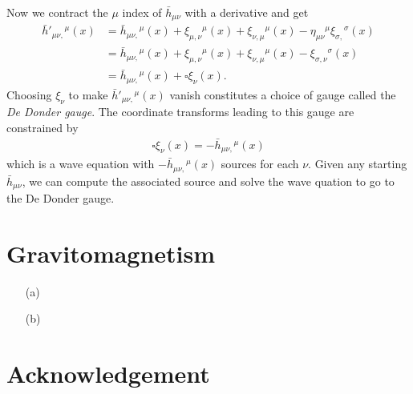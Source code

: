 \documentclass[10pt, a4paper]{article}
\begin{document}
\begin{enumerate}
\begin{align*}
  \end{align*}
  Now we contract the $\mu$ index of $\bar{h}_{\mu \nu}$ with a derivative and get
  \begin{align*}
    \bar{h}'{}_{\mu \nu,}{}^{\mu}(x) &=  \bar{h}{}_{\mu \nu,}{}^{\mu}(x) + \xi_{\mu,\nu}{}^{\mu}(x) + \xi_{\nu,\mu}{}^{\mu}(x) - \eta_{\mu \nu}{}^{\mu} \xi_{\sigma,}{}^{\sigma}(x)\\
    &=  \bar{h}{}_{\mu \nu,}{}^{\mu}(x) + \xi_{\mu,\nu}{}^{\mu}(x) + \xi_{\nu,\mu}{}^{\mu}(x) -  \xi_{\sigma,\nu}{}^{\sigma}(x)\\
    &= \bar{h}{}_{\mu \nu,}{}^{\mu}(x) + \square \xi_{\nu}(x). 
  \end{align*} 
Choosing $\xi_\nu$ to make $\bar{h}'{}_{\mu \nu,}{}^{\mu}(x)$ vanish constitutes a choice of gauge called the \textit{De Donder gauge}. The coordinate transforms leading to this gauge are constrained by 
\begin{align*}
  \square \xi_{\nu}(x) = -\bar{h}{}_{\mu \nu,}{}^{\mu}(x) 
\end{align*}
which is a wave equation with $-\bar{h}{}_{\mu \nu,}{}^{\mu}(x)$ sources for each $\nu$. Given any starting $\bar{h}_{\mu \nu}$, we can compute the associated source and solve the wave quation to go to the De Donder gauge. 
\end{enumerate}

\section{Gravitomagnetism}
\begin{enumerate}
  \item[(a)]
  \item[(b)]
\end{enumerate}

\section{Acknowledgement}



\makereferences


\end{document}
